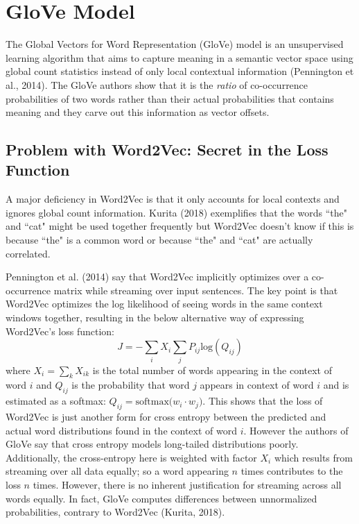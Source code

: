 \section{GloVe Model} \label{Glove}

The Global Vectors for Word Representation (GloVe) model is an unsupervised learning algorithm that aims to capture meaning in a semantic vector space using global count statistics instead of only local contextual information (Pennington et al., 2014). The GloVe authors show that it is the \emph{ratio} of co-occurrence probabilities of two words rather than their actual probabilities that contains meaning and they carve out this information as vector offsets. 

\subsection{Problem with Word2Vec: Secret in the Loss Function}

A major deficiency in Word2Vec is that it only accounts for local contexts and ignores global count information. Kurita (2018) exemplifies that the words ``the" and ``cat" might be used together frequently but Word2Vec doesn't know if this is because ``the" is a common word or because ``the" and ``cat" are actually correlated. 

Pennington et al. (2014) say that Word2Vec implicitly optimizes over a co-occurrence matrix while streaming over input sentences. The key point is that Word2Vec optimizes the log likelihood of seeing words in the same context windows together, resulting in the below alternative way of expressing Word2Vec's loss function: 
$$
J = - \sum_i X_i \sum_j P_{ij} \text{log}(Q_{ij}) 
$$
where $X_i = \sum_k X_{ik}$ is the total number of words appearing in the context of word $i$ and $Q_{ij}$ is the probability that word $j$ appears in context of word $i$ and is estimated as a softmax: $Q_{ij} = \text{softmax} \Big( w_i \cdot w_j \Big)$. This shows that the loss of Word2Vec is just another form for cross entropy between the predicted and actual word distributions found in the context of word $i$. However the authors of GloVe say that cross entropy models long-tailed distributions poorly. Additionally, the cross-entropy here is weighted with factor $X_i$ which results from streaming over all data equally; so a word appearing $n$ times contributes to the loss $n$ times. 
However, there is no inherent justification for streaming across all words equally. In fact, GloVe computes differences between unnormalized probabilities, contrary to Word2Vec (Kurita, 2018). 


